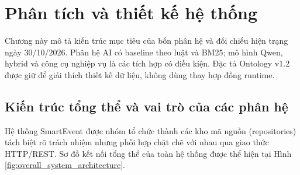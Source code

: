 \chapter{Phân tích và thiết kế hệ thống}
\label{chap:system_design}

Chương này mô tả kiến trúc mục tiêu của bốn phân hệ và đối chiếu hiện trạng ngày 30/10/2026. Phân hệ AI có baseline theo luật và BM25; mô hình Qwen, hybrid và công cụ nghiệp vụ là các tích hợp có điều kiện. Đặc tả Ontology v1.2 được giữ để giải thích thiết kế dữ liệu, không dùng thay hợp đồng runtime.

\section{Kiến trúc tổng thể và vai trò của các phân hệ}
\label{sec:overall_architecture}

Hệ thống SmartEvent được nhóm tổ chức thành các kho mã nguồn (repositories) tách biệt rõ trách nhiệm nhưng phối hợp chặt chẽ với nhau qua giao thức HTTP/REST. Sơ đồ kết nối tổng thể của toàn hệ thống được thể hiện tại Hình \ref{fig:overall_system_architecture}.

